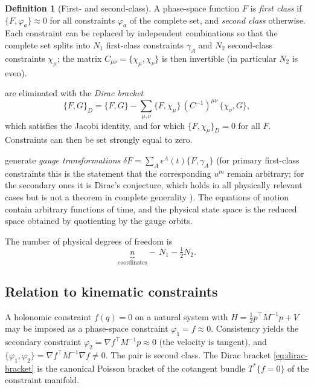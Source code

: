 \documentclass[11pt,a4paper]{article}
\theoremstyle{definition}
\newtheorem{definition}{Definition}[section]
\theoremstyle{plain}
\theoremstyle{remark}
\newcommand{\Pois}[2]{\{#1,#2\}}
\newcommand{\weq}{\approx}                 %
\newcommand{\transp}{^{\!\top}}
\begin{document}
\begin{definition}[First- and second-class]
A phase-space function $F$ is \emph{first class} if $\Pois F{\varphi_a}\weq0$ for all
constraints $\varphi_a$ of the complete set, and \emph{second class} otherwise. Each constraint
can be replaced by independent combinations so that the complete set splits into $N_1$
first-class constraints $\gamma_A$ and $N_2$ second-class constraints $\chi_\mu$; the
matrix $C_{\mu\nu}=\Pois{\chi_\mu}{\chi_\nu}$ is then invertible (in particular $N_2$ is even).
\end{definition}

\begin{description}[leftmargin=1.2em,style=nextline]
\item[Second-class constraints] are eliminated with the \emph{Dirac bracket}
  \begin{equation}\label{eq:dirac-bracket}
    \Pois FG_D=\Pois FG-\sum_{\mu,\nu}\Pois F{\chi_\mu}\,(C^{-1})^{\mu\nu}\,\Pois{\chi_\nu}G ,
  \end{equation}
  which satisfies the Jacobi identity, and for which $\Pois F{\chi_\mu}_D=0$ for all $F$.
  Constraints can then be set strongly equal to zero.
\item[First-class constraints] generate \emph{gauge transformations}
  $\delta F=\sum_A\epsilon^A(t)\Pois F{\gamma_A}$ (for primary first-class constraints this
  is the statement that the corresponding $u^m$ remain arbitrary; for the secondary ones it is
  Dirac's conjecture, which holds in all physically relevant cases but is not a theorem in
  complete generality \cite{HenneauxTeitelboim1992}). The equations of motion contain
  arbitrary functions of time, and the physical state space is the reduced space obtained by
  quotienting by the gauge orbits.
\end{description}
The number of physical degrees of freedom is
\begin{equation}\label{eq:dof}
  \underbrace{n}_{\text{coordinates}}-\,N_1-\tfrac12N_2 .
\end{equation}

\subsection{Relation to kinematic constraints}
A holonomic constraint $f(q)=0$ on a natural system with $H=\tfrac12p\transp M^{-1}p+V$ may
be imposed as a phase-space constraint $\varphi_1=f\weq0$. Consistency yields the secondary
constraint $\varphi_2=\nabla f\transp M^{-1}p\weq0$ (the velocity is tangent), and
$\Pois{\varphi_1}{\varphi_2}=\nabla f\transp M^{-1}\nabla f\neq0$. The pair is second class.
The Dirac bracket \eqref{eq:dirac-bracket} is the canonical Poisson bracket of
the cotangent bundle $T^*\{f=0\}$ of the constraint manifold.
\end{document}
